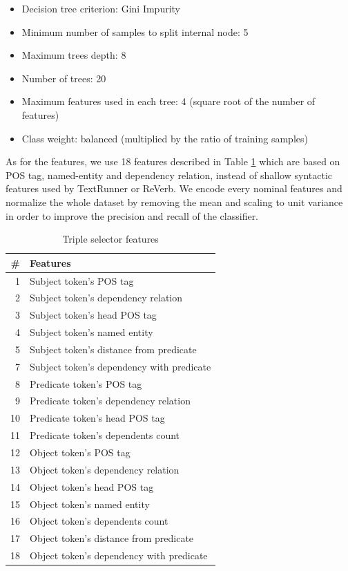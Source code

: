 \documentclass[conference,compsoc]{IEEEtran}
\begin{document}
\begin{itemize}
\item Decision tree criterion: Gini Impurity
\item Minimum number of samples to split internal node: 5
\item Maximum trees depth: 8
\item Number of trees: 20
\item Maximum features used in each tree: 4 (square root of the number of features)
\item Class weight: balanced (multiplied by the ratio of training samples)
\end{itemize}

As for the features, we use 18 features described in Table \ref{table_models_features} which are based on POS tag, named-entity and dependency relation, instead of shallow syntactic features used by TextRunner or ReVerb\cite{banko2007open}\cite{etzioni2011open}. We encode every nominal features and normalize the whole dataset by removing the mean and scaling to unit variance in order to improve the precision and recall of the classifier.

\begin{table}[!t]
\renewcommand{\arraystretch}{1.5}
\caption{Triple selector features}
\label{table_models_features}
\centering
\begin{tabular}{r|l}
\hline
\textbf{\#} & \textbf{Features} \\
\hline
1 & Subject token's POS tag \\
2 & Subject token's dependency relation \\
3 & Subject token's head POS tag \\
4 & Subject token's named entity \\
5 & Subject token's distance from predicate \\
7 & Subject token's dependency with predicate \\
8 & Predicate token's POS tag \\
9 & Predicate token's dependency relation \\
10 & Predicate token's head POS tag \\
11 & Predicate token's dependents count \\
12 & Object token's POS tag \\
13 & Object token's dependency relation \\
14 & Object token's head POS tag \\
15 & Object token's named entity \\
16 & Object token's dependents count \\
17 & Object token's distance from predicate \\
18 & Object token's dependency with predicate \\
\end{tabular}
\end{table}
\end{document}
